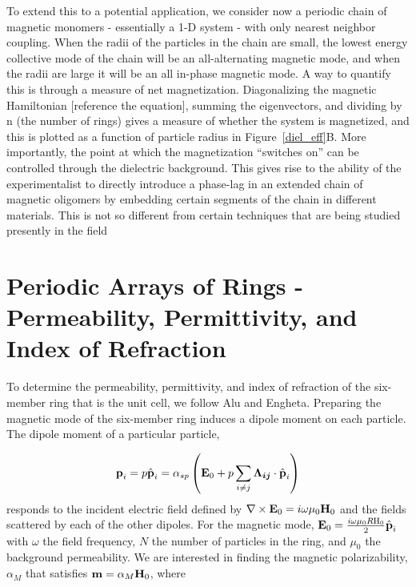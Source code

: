 \documentclass[journal=apchd5,manuscript=article]{achemso}
\begin{document}
To extend this to a potential application, we consider now a periodic chain of magnetic monomers - essentially a 1-D system - with only nearest neighbor coupling. When the radii of the particles in the chain are small, the lowest energy collective mode of the chain will be an all-alternating magnetic mode, and when the radii are large it will be an all in-phase magnetic mode. A way to quantify this is through a measure of net magnetization. Diagonalizing the magnetic Hamiltonian [reference the equation], summing the eigenvectors, and dividing by n (the number of rings) gives a measure of whether the system is magnetized, and this is plotted as a function of particle radius in Figure~\ref{diel_eff}B. More importantly, the point at which the magnetization ``switches on'' can be controlled through the dielectric background. This gives rise to the ability of the experimentalist to directly introduce a phase-lag in an extended chain of magnetic oligomers by embedding certain segments of the chain in different materials. This is not so different from certain techniques that are being studied presently in the field\cite{odom_lasing}

\section{Periodic Arrays of Rings - Permeability, Permittivity, and Index of Refraction}
To determine the permeability, permittivity, and index of refraction of the six-member ring that is the unit cell, we follow Alu and Engheta\cite{Alu2006}. Preparing the magnetic mode of the six-member ring induces a dipole moment on each particle. The dipole moment of a particular particle,

\begin{equation}
\textrm{\textbf{p}}_{i} = p\hat{\textrm{\textbf{p}}}_{i} = \alpha_{sp}\left(\textrm{\textbf{E}}_{0} + p\sum_{i\neq j}\boldsymbol{\Lambda_{ij}}\cdot\hat{\textrm{\textbf{p}}}_{i}\right)
\label{dipolemoment}
\end{equation} 
 responds to the incident electric field defined by $\nabla \times \textrm{\textbf{E}}_{0} = i\omega\mu_{0}\textrm{\textbf{H}}_{0}$ and the fields scattered by each of the other dipoles. For the magnetic mode, $\textrm{\textbf{E}}_{0} = \frac{i\omega\mu_{0}R\textrm{H}_{0}}{2}\hat{\textrm{\textbf{p}}}_{i}$ with $\omega$ the field frequency, $N$ the number of particles in the ring, and $\mu_{0}$ the background permeability. We are interested in finding the magnetic polarizability, $\alpha_{M}$ that satisfies $\textrm{\textbf{m}} = \alpha_{M}\textrm{\textbf{H}}_{0}$, where
\end{document}
